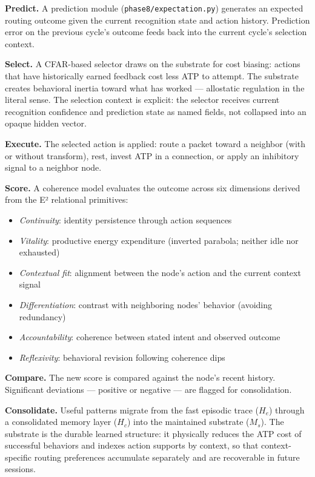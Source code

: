 \documentclass[letterpaper]{article}
\begin{document}
\textbf{Predict.} A prediction module (\texttt{phase8/expectation.py}) generates an expected routing outcome given the current recognition state and action history. Prediction error on the previous cycle's outcome feeds back into the current cycle's selection context.

\textbf{Select.} A CFAR-based selector draws on the substrate for cost biasing: actions that have historically earned feedback cost less ATP to attempt. The substrate creates behavioral inertia toward what has worked — allostatic regulation in the literal sense. The selection context is explicit: the selector receives current recognition confidence and prediction state as named fields, not collapsed into an opaque hidden vector.

\textbf{Execute.} The selected action is applied: route a packet toward a neighbor (with or without transform), rest, invest ATP in a connection, or apply an inhibitory signal to a neighbor node.

\textbf{Score.} A coherence model evaluates the outcome across six dimensions derived from the E² relational primitives:
\begin{itemize}
    \item \textit{Continuity}: identity persistence through action sequences
    \item \textit{Vitality}: productive energy expenditure (inverted parabola; neither idle nor exhausted)
    \item \textit{Contextual fit}: alignment between the node's action and the current context signal
    \item \textit{Differentiation}: contrast with neighboring nodes' behavior (avoiding redundancy)
    \item \textit{Accountability}: coherence between stated intent and observed outcome
    \item \textit{Reflexivity}: behavioral revision following coherence dips
\end{itemize}

\textbf{Compare.} The new score is compared against the node's recent history. Significant deviations — positive or negative — are flagged for consolidation.

\textbf{Consolidate.} Useful patterns migrate from the fast episodic trace ($H_e$) through a consolidated memory layer ($H_c$) into the maintained substrate ($M_s$). The substrate is the durable learned structure: it physically reduces the ATP cost of successful behaviors and indexes action supports by context, so that context-specific routing preferences accumulate separately and are recoverable in future sessions.
\end{document}
